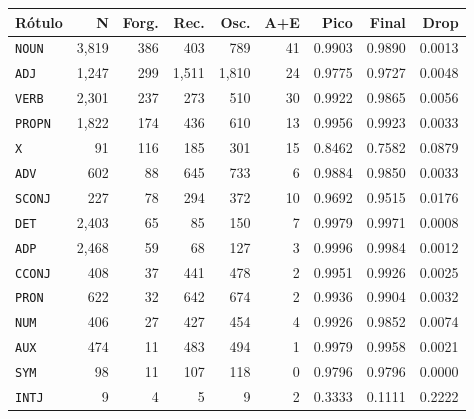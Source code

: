 \begin{table}[ht]
\hfill
\begin{minipage}[t]{0.42\linewidth}
\centering\tiny
\begin{tabular}{lrrrrrrrr}
\toprule
\textbf{Rótulo} & \textbf{N} & \textbf{Forg.} & \textbf{Rec.} & \textbf{Osc.} & \textbf{A+E} & \textbf{Pico} & \textbf{Final} & \textbf{Drop} \\
\midrule
\texttt{NOUN} & 3,819 & 386 & 403 & 789 & 41 & 0.9903 & 0.9890 & 0.0013 \\
\texttt{ADJ} & 1,247 & 299 & 1,511 & 1,810 & 24 & 0.9775 & 0.9727 & 0.0048 \\
\texttt{VERB} & 2,301 & 237 & 273 & 510 & 30 & 0.9922 & 0.9865 & 0.0056 \\
\texttt{PROPN} & 1,822 & 174 & 436 & 610 & 13 & 0.9956 & 0.9923 & 0.0033 \\
\texttt{X} & 91 & 116 & 185 & 301 & 15 & 0.8462 & 0.7582 & 0.0879 \\
\texttt{ADV} & 602 & 88 & 645 & 733 & 6 & 0.9884 & 0.9850 & 0.0033 \\
\texttt{SCONJ} & 227 & 78 & 294 & 372 & 10 & 0.9692 & 0.9515 & 0.0176 \\
\texttt{DET} & 2,403 & 65 & 85 & 150 & 7 & 0.9979 & 0.9971 & 0.0008 \\
\texttt{ADP} & 2,468 & 59 & 68 & 127 & 3 & 0.9996 & 0.9984 & 0.0012 \\
\texttt{CCONJ} & 408 & 37 & 441 & 478 & 2 & 0.9951 & 0.9926 & 0.0025 \\
\texttt{PRON} & 622 & 32 & 642 & 674 & 2 & 0.9936 & 0.9904 & 0.0032 \\
\texttt{NUM} & 406 & 27 & 427 & 454 & 4 & 0.9926 & 0.9852 & 0.0074 \\
\texttt{AUX} & 474 & 11 & 483 & 494 & 1 & 0.9979 & 0.9958 & 0.0021 \\
\texttt{SYM} & 98 & 11 & 107 & 118 & 0 & 0.9796 & 0.9796 & 0.0000 \\
\texttt{INTJ} & 9 & 4 & 5 & 9 & 2 & 0.3333 & 0.1111 & 0.2222 \\
\bottomrule
\end{tabular}
\end{minipage}
\end{table}



